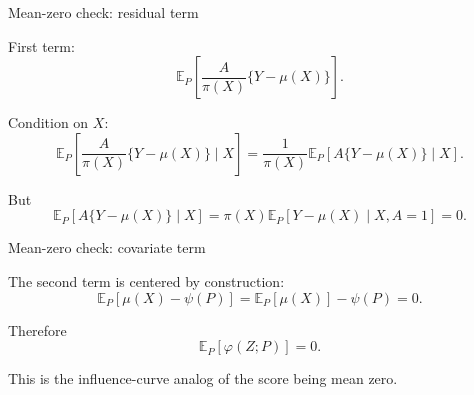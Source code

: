 \documentclass[xcolor={table}, handout]{beamer}
\begin{document}
\note{
\scriptsize \singlespacing

}
\begin{frame}{Mean-zero check: residual term}

\small

\begin{wideitemize}
\item First term:
\[
\mathbb{E}_P
\left[
  \frac{A}{\pi(X)}
  \{Y-\mu(X)\}
\right].
\]\pause
\item Condition on $X$:
\[
\mathbb{E}_P
\left[
  \frac{A}{\pi(X)}
  \{Y-\mu(X)\}
  \mid X
\right]
  =
  \frac{1}{\pi(X)}
  \mathbb{E}_P[A\{Y-\mu(X)\}\mid X].
\]\pause
\item But
\[
\mathbb{E}_P[A\{Y-\mu(X)\}\mid X]
  =
  \pi(X)\mathbb{E}_P[Y-\mu(X)\mid X,A=1]
  =
  0.
\]
\end{wideitemize}

\end{frame}

\note{
\scriptsize \singlespacing

}
\begin{frame}{Mean-zero check: covariate term}

\begin{wideitemize}
\item The second term is centered by construction:
\[
\mathbb{E}_P[\mu(X)-\psi(P)]
  =
  \mathbb{E}_P[\mu(X)]
  -
  \psi(P)
  =
  0.
\]\pause
\item Therefore
\[
\mathbb{E}_P[\varphi(Z;P)]=0.
\]\pause
\item This is the influence-curve analog of the score being mean zero.
\end{wideitemize}

\end{frame}
\end{document}
